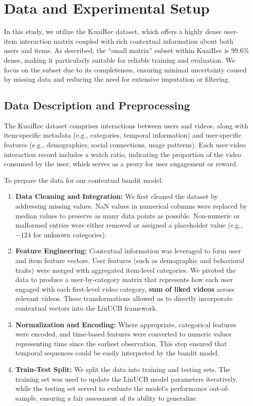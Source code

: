 \section{Data and Experimental Setup}

In this study, we utilize the KuaiRec dataset, which offers a highly dense user-item interaction matrix coupled with rich contextual information about both users and items. As described, the “small matrix” subset within KuaiRec is $99.6\%$ dense, making it particularly suitable for reliable training and evaluation. We focus on the subset due to its completeness, ensuring minimal uncertainty caused by missing data and reducing the need for extensive imputation or filtering.

\subsection{Data Description and Preprocessing}

The KuaiRec dataset comprises interactions between users and videos, along with item-specific metadata (e.g., categories, temporal information) and user-specific features (e.g., demographics, social connections, usage patterns). Each user-video interaction record includes a watch ratio, indicating the proportion of the video consumed by the user, which serves as a proxy for user engagement or reward.

To prepare the data for our contextual bandit model:

\begin{enumerate}
    \item \textbf{Data Cleaning and Integration:} We first cleaned the dataset by addressing missing values. NaN values in numerical columns were replaced by median values to preserve as many data points as possible. Non-numeric or malformed entries were either removed or assigned a placeholder value (e.g., \(-124\) for unknown categories).

    \item \textbf{Feature Engineering:} Contextual information was leveraged to form user and item feature vectors. User features (such as demographic and behavioral traits) were merged with aggregated item-level categories. We pivoted the data to produce a user-by-category matrix that represents how each user engaged with each first-level video category, \textbf{sum of liked videos} across relevant videos. These transformations allowed us to directly incorporate contextual vectors into the LinUCB framework.

    \item \textbf{Normalization and Encoding:} Where appropriate, categorical features were encoded, and time-based features were converted to numeric values representing time since the earliest observation. This step ensured that temporal sequences could be easily interpreted by the bandit model.

    \item \textbf{Train-Test Split:} We split the data into training and testing sets. The training set was used to update the LinUCB model parameters iteratively, while the testing set served to evaluate the model’s performance out-of-sample, ensuring a fair assessment of its ability to generalize.
\end{enumerate}